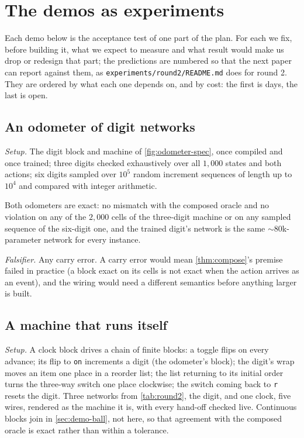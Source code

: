 \section{The demos as experiments}
\label{sec:demos}

Each demo below is the acceptance test of one part of the plan. For each we fix, before building it, what we
expect to measure and what result would make us drop or redesign that part; the predictions are numbered so
that the next paper can report against them, as \texttt{experiments/round2/README.md} does for round 2. They
are ordered by what each one depends on, and by cost: the first is days, the last is open.

\subsection{An odometer of digit networks}
\label{sec:demo-odometer}

\emph{Setup.} The digit block and machine of \cref{fig:odometer-spec}, once compiled and once trained; three
digits checked exhaustively over all $1{,}000$ states and both actions; six digits sampled over $10^5$ random
increment sequences of length up to $10^4$ and compared with integer arithmetic.

\begin{prediction}
\label{pred:odometer}
Both odometers are exact: no mismatch with the composed oracle and no violation on any of the $2{,}000$ cells
of the three-digit machine or on any sampled sequence of the six-digit one, and the trained digit's network is
the same $\sim80$k-parameter network for every instance.
\end{prediction}
\emph{Falsifier.} Any carry error. A carry error would mean \cref{thm:compose}'s premise failed in practice
(a block exact on its cells is not exact when the action arrives as an event), and the wiring would need a
different semantics before anything larger is built.

\subsection{A machine that runs itself}
\label{sec:demo-chain}

\emph{Setup.} A clock block drives a chain of finite blocks: a toggle flips on every advance; its flip to
\texttt{on} increments a digit (the odometer's block); the digit's wrap moves an item one place in a reorder
list; the list returning to its initial order turns the three-way switch one place clockwise; the switch
coming back to \texttt{r} resets the digit. Three networks from \cref{tab:round2}, the digit, and one clock,
five wires, rendered as the machine it is, with every hand-off checked live. Continuous blocks join in
\cref{sec:demo-ball}, not here, so that agreement with the composed oracle is exact rather than within a
tolerance.

